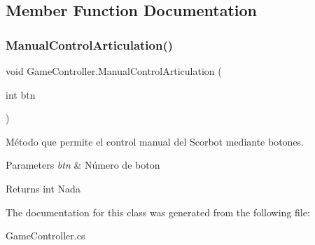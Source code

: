 \subsection{Member Function Documentation}
\mbox{\label{class_game_controller_af2f693d76f1b9bf4ff0403802ad44cae}} 
\subsubsection{\texorpdfstring{ManualControlArticulation()}{ManualControlArticulation()}}
{\footnotesize\ttfamily void Game\+Controller.\+Manual\+Control\+Articulation (\begin{DoxyParamCaption}\item[{int}]{btn }\end{DoxyParamCaption})\hspace{0.3cm}{\ttfamily [inline]}}

Método que permite el control manual del Scorbot mediante botones. 
\begin{DoxyParams}{Parameters}
{\em btn} & Número de boton \\
\hline
\end{DoxyParams}
\begin{DoxyReturn}{Returns}
int Nada 
\end{DoxyReturn}


The documentation for this class was generated from the following file\+:\begin{DoxyCompactItemize}
\item 
Game\+Controller.\+cs\end{DoxyCompactItemize}
